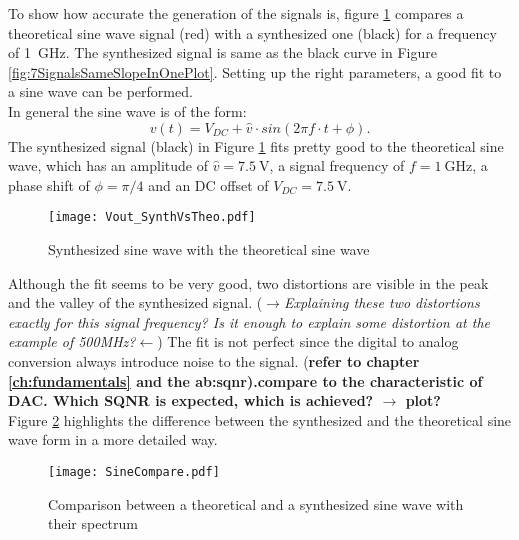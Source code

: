 To show how accurate the generation of the signals is, figure \ref{fig:SineWaveSynthVsTheoretical} compares a theoretical sine wave signal (red) with a synthesized one (black) for a frequency of \SI{1}{\GHz}.
The synthesized signal is same as the black curve in Figure \ref{fig:7SignalsSameSlopeInOnePlot}.
Setting up the right parameters, a good fit to a sine wave can be performed.\\
In general the sine wave is of the form: 
\begin{equation}
	v(t)= V_{DC} + \widehat{v} \cdot sin( 2  \pi  f \cdot  t + \phi).
\end{equation}
The synthesized signal (black) in Figure \ref{fig:SineWaveSynthVsTheoretical} fits pretty good to the theoretical sine wave, which has an amplitude of $\widehat{v} = \SI{7.5}{\volt}$, a signal frequency of $f = \SI{1}{\giga \hertz}$, a phase shift of $\phi = \pi / 4$ and an DC offset of $V_{DC} = \SI{7.5}{\volt}$.

\begin{figure}[htb!]
   \centering
   \texttt{[image: Vout\_SynthVsTheo.pdf]}
   \caption{Synthesized sine wave with the theoretical sine wave}
   \label{fig:SineWaveSynthVsTheoretical}
\end{figure}

Although the fit seems to be very good, two distortions are visible in the peak and the valley of the synthesized signal.
($\rightarrow$\textit{Explaining these two distortions exactly for this signal frequency? Is it enough to explain some distortion at the example of 500MHz?}$\leftarrow$)
The fit is not perfect since the digital to analog conversion always introduce noise to the signal. (\textbf{refer to chapter \ref{ch:fundamentals} and the \gls{ab:sqnr}).compare to the characteristic of DAC. Which SQNR is expected, which is achieved? $\rightarrow$ plot?} \\

Figure \ref{fig:SineCompare} highlights the difference between the synthesized and the theoretical sine wave form in a more detailed way.

\begin{figure}[htb!]
	\centering
  \texttt{[image: SineCompare.pdf]}
	\caption{Comparison between a theoretical and a synthesized sine wave with their spectrum}
	\label{fig:SineCompare}
\end{figure}

